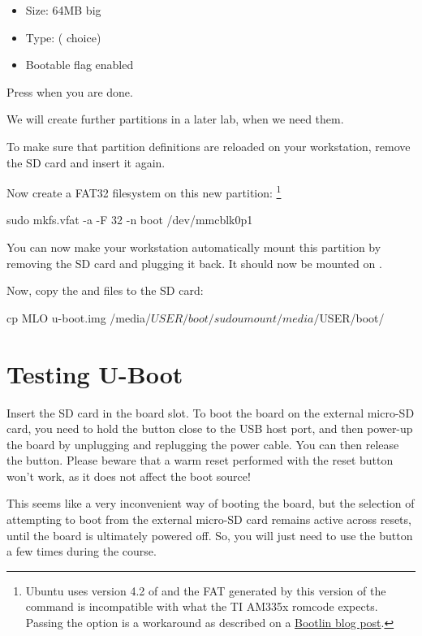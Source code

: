 \begin{itemize}
\item Size: 64MB big
\item Type:  ( choice)
\item Bootable flag enabled
\end{itemize}

Press  when you are done.

We will create further partitions in a later lab, when we need them.

To make sure that partition definitions are reloaded on your
workstation, remove the SD card and insert it again.

Now create a FAT32 filesystem on this new partition:
\footnote{Ubuntu uses version 4.2 of  and the FAT
generated by this version of the command is incompatible with what
the TI AM335x romcode expects. Passing the  option
is a workaround as described on a \href{https://bootlin.com/blog/workaround-for-creating-bootable-fat-partition-for-beagle-bone-am335x-on-recent-distros/}
{Bootlin blog post}.}
\begin{bashinput}
sudo mkfs.vfat -a -F 32 -n boot /dev/mmcblk0p1
\end{bashinput}

You can now make your workstation automatically mount this
partition by removing the SD card and plugging it back. It should
now be mounted on .

Now, copy the  and  files to the SD card:
\begin{bashinput}
cp MLO u-boot.img /media/$USER/boot/
sudo umount /media/$USER/boot/
\end{bashinput}

\section{Testing U-Boot}

Insert the SD card in the board slot. To boot the board on the external micro-SD
card, you need to hold the  button close to the USB host port,
and then power-up the board by unplugging and replugging the power cable.  You
can then release the  button. Please beware that a warm reset
performed with the reset button won't work, as it does not affect the boot
source!

This seems like a very inconvenient way of booting the board, but
the selection of attempting to boot from the external micro-SD card
remains active across resets, until the board is ultimately powered off.
So, you will just need to use the button a few times during the course.

